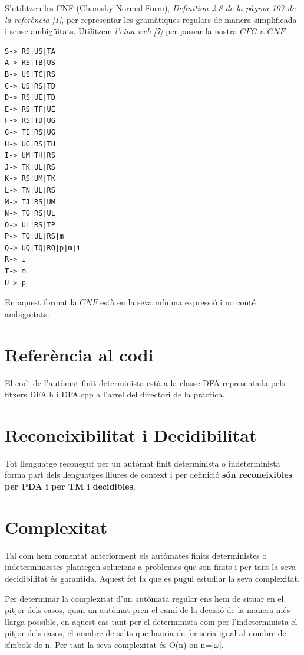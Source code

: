 \documentclass[12pt,a4paper]{report}
\def \w{$\omega$}
\begin{document}
S’utilitzen les CNF (Chomsky Normal Form), \textit{Definition 2.8 de la pàgina 107 de la referència [1]}, per representar les gramàtiques regulars de manera simplificada i sense ambigüitats. Utilitzem \textit{l’eina web [7]} per passar la nostra $CFG$ a $CNF$.

\begin{lstlisting}
S-> RS|US|TA
A-> RS|TB|US
B-> US|TC|RS
C-> US|RS|TD
D-> RS|UE|TD
E-> RS|TF|UE
F-> RS|TD|UG
G-> TI|RS|UG
H-> UG|RS|TH
I-> UM|TH|RS
J-> TK|UL|RS
K-> RS|UM|TK
L-> TN|UL|RS
M-> TJ|RS|UM
N-> TO|RS|UL
O-> UL|RS|TP
P-> TQ|UL|RS|m
Q-> UQ|TQ|RQ|p|m|i
R-> i
T-> m
U-> p

\end{lstlisting}

En aquest format la $CNF$ està en la seva mínima expressió i no conté ambigüitats.

\section{Referència al codi}

El codi de l'autòmat finit determinista està a la classe DFA representada pels fitxers DFA.h i DFA.cpp a l'arrel del directori de la pràctica.

\section{Reconeixibilitat i Decidibilitat}

Tot llenguatge reconegut per un autòmat finit determinista o indeterminista forma part dels llenguatges lliures de context i per definició \textbf{són reconeixibles per PDA i per TM i decidibles}.

\section{Complexitat}

Tal com hem comentat anteriorment els autòmates finits deterministes o indeterminiestes plantegen solucions a problemes que son finits i per tant la seva decidibilitat és garantida. Aquest fet fa que es pugui estudiar la seva complexitat. 

Per determinar la complexitat d'un autòmata regular ens hem de situar en el pitjor dels casos, quan un autòmat pren el camí de la decisió de la manera més llarga possible, en aquest cas tant per el determinista com per l'indeterminista el pitjor dels casos, el nombre de salts que hauria de fer seria igual al nombre de símbols de n. Per tant la seva complexitat és O(n) on n=|\w{}|.
\end{document}
